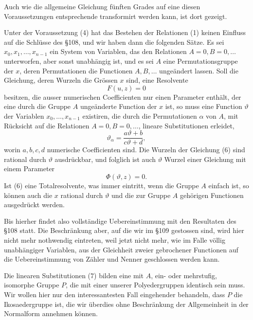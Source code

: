 \documentclass[11pt]{article}
\begin{document}
Auch wie die allgemeine Gleichung fünften Grades auf eine diesen Voraussetzungen entsprechende transformirt werden kann, ist dort gezeigt.

Unter der Voraussetzung (4) hat das Bestehen der Relationen (1) keinen Einfluss auf die Schlüsse des §108, und wir haben dann die folgenden Sätze. Es sei \(x_0,x_1,\ldots,x_{n-1}\) ein System von Variablen, das den Relationen \(A=0,B=0,\ldots\) unterworfen, aber sonst unabhängig ist, und es sei \(A\) eine Permutationsgruppe der \(x\), deren Permutationen die Functionen \(A,B,\ldots\) ungeändert lassen. Soll die Gleichung, deren Wurzeln die Grössen \(x\) sind, eine Resolvente
\begin{equation}
F(u,z)=0
\tag{6}
\end{equation}
besitzen, die ausser numerischen Coefficienten nur einen Parameter enthält, der eine durch die Gruppe \(A\) ungeänderte Function der \(x\) ist, so muss eine Function \(\vartheta\) der Variablen \(x_0,\ldots,x_{n-1}\) existiren, die durch die Permutationen \(\alpha\) von \(A\), mit Rücksicht auf die Relationen \(A=0,B=0,\ldots\), lineare Substitutionen erleidet,
\begin{equation}
\vartheta_\alpha=\frac{a\vartheta+b}{c\vartheta+d},
\tag{7}
\end{equation}
worin \(a,b,c,d\) numerische Coefficienten sind. Die Wurzeln der Gleichung (6) sind rational durch \(\vartheta\) ausdrückbar, und folglich ist auch \(\vartheta\) Wurzel einer Gleichung mit einem Parameter
\begin{equation}
\Phi(\vartheta,z)=0.
\tag{8}
\end{equation}
Ist (6) eine Totalresolvente, was immer eintritt, wenn die Gruppe \(A\) einfach ist, so können auch die \(x\) rational durch \(\vartheta\) und die zur Gruppe \(A\) gehörigen Functionen ausgedrückt werden.

Bis hierher findet also vollständige Uebereinstimmung mit den Resultaten des §108 statt. Die Beschränkung aber, auf die wir im §109 gestossen sind, wird hier nicht mehr nothwendig eintreten, weil jetzt nicht mehr, wie im Falle völlig unabhängiger Variablen, aus der Gleichheit zweier gebrochener Functionen auf die Uebereinstimmung von Zähler und Nenner geschlossen werden kann.

Die linearen Substitutionen (7) bilden eine mit \(A\), ein- oder mehrstufig, isomorphe Gruppe \(P\), die mit einer unserer Polyedergruppen identisch sein muss. Wir wollen hier nur den interessantesten Fall eingehender behandeln, dass \(P\) die Ikosaedergruppe ist, die wir überdies ohne Beschränkung der Allgemeinheit in der Normalform annehmen können.
\end{document}
